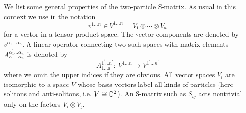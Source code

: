 \documentclass[a4paper,a4paper]{article}
\begin{document}
We list some general properties of the two-particle S-matrix. As usual in
this context we use in the notation 
\[
v^{1\dots n}\in V^{1\dots n}=V_{1}\otimes \cdots \otimes V_{n} 
\]
for a vector in a tensor product space. The vector components are denoted by 
$v^{\alpha _{1}\dots \alpha _{n}}$. A linear operator connecting two such
spaces with matrix elements $A_{\alpha _{1}\dots \alpha _{n}}^{\alpha
_{1}^{\prime }\dots \alpha _{n^{\prime }}^{\prime }}$ is denoted by 
\[
A_{1\dots n}^{1^{\prime }\dots n^{\prime }}:~V^{1\dots n}\to V^{1^{\prime
}\dots n^{\prime }} 
\]
where we omit the upper indices if they are obvious. All vector spaces $%
V_{i} $ are isomorphic to a space $V$ whose basis vectors label all kinds of
particles (here solitons and anti-solitons, i.e. $V\cong \Bbb{C}^{2}$). An
S-matrix such as $S_{ij}$ acts nontrivial only on the factors $V_{i}\otimes
V_{j}$.
\end{document}
